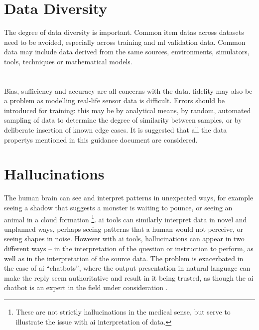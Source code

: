 \section{Data Diversity}
The degree of data diversity is important. Common \glspl{item data} across \glspl{dataset} need to be avoided, especially across training and
\gls{ml}
validation data. Common data may include data derived from the same sources, environments, simulators, tools, techniques or mathematical models.

\section{}
Bias, sufficiency and \gls{accuracy} are all concerns with the data. \gls{fidelity} may also be a problem as modelling real-life sensor data is difficult.  Errors should be introduced for training: this may be by analytical means, by random, automated sampling of data to determine the degree of similarity between samples, or by deliberate insertion of known edge cases. 
It is suggested that all the \glspl{data property} mentioned in this guidance document are considered.

\section{Hallucinations}
\label{bkm:MachineLearning:Hallucinations}
%
The human brain can see and interpret patterns in unexpected ways, for example seeing a shadow that
suggests a monster is waiting to pounce, or seeing an animal in a cloud formation%
\footnote{These are not strictly hallucinations in the medical sense, but serve to illustrate
the issue with \gls{ai} interpretation of data.}.
\Gls{ai} tools can similarly interpret data in novel and unplanned ways, perhaps seeing patterns that a
human would not perceive, or seeing shapes in noise. However with \gls{ai} tools, hallucinations can appear
in two different ways -- in the interpretation of the question or instruction to perform, as well as
in the interpretation of the source data.
The problem is exacerbated in the case of \gls{ai} ``chatbots'', where the output presentation in natural
language can make the  reply seem authoritative and result in it being trusted, as though the
\gls{ai} chatbot is an expert in the field under consideration \cite{citation:chatbotsterrible:website}. 

